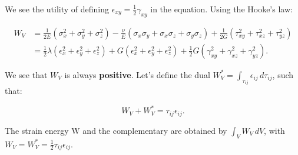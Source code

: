 	We see the utility of defining $\epsilon _{xy} = \frac{1}{2} \gamma _{xy}$ in the equation. Using the Hooke's law:
	
	\begin{equation}
	\begin{aligned}
	W_V &= \frac{1}{2E}(\sigma _x ^2 + \sigma _y ^2 +\sigma _z ^2) - \frac{\nu }{E} ( \sigma _x\sigma _y + \sigma _x\sigma _z + \sigma _y \sigma _z) + \frac{1}{2G} (\tau _{xy}^2+\tau _{xz}^2+\tau _{yz}^2)\\
	&= \frac{1}{2}\lambda (\epsilon _x ^2+\epsilon _y ^2+\epsilon _z ^2) + G(\epsilon _x ^2+\epsilon _y ^2+\epsilon _z ^2) + \frac{1}{2} G (\gamma _{xy}^2 +\gamma _{xz}^2 + \gamma _{yz}^2).
	\end{aligned}
	\end{equation}
	
	We see that $W_V$ is always \textbf{positive}. Let's define the dual $W_V^* = \int _{\tau _{ij}} \epsilon _{ij} \, d\tau _{ij}$, such that:
	
	\begin{equation}
	W_V + W_V^* = \tau _{ij} \epsilon _{ij}.
	\end{equation}
	
	The strain energy W and the complementary are obtained by $\int _V W_V\, dV$, with $W_V = W_V^* = \frac{1}{2}\tau _{ij}\epsilon _{ij}$.